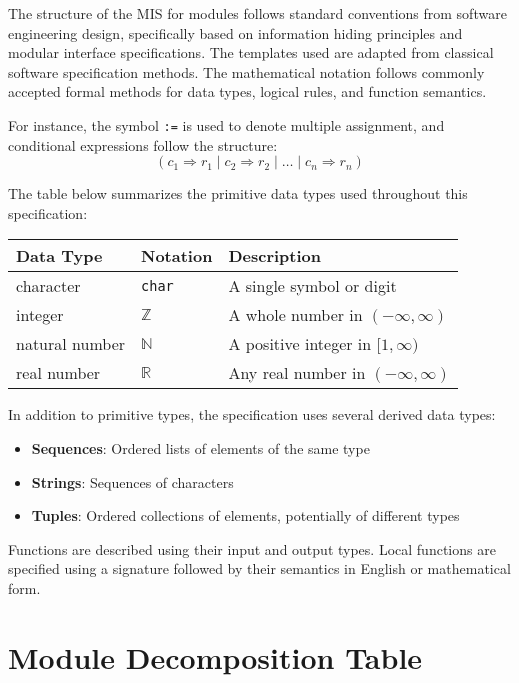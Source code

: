 \documentclass[12pt, titlepage]{article}
\begin{document}
The structure of the MIS for modules follows standard conventions from software engineering design, specifically based on information hiding principles and modular interface specifications. The templates used are adapted from classical software specification methods. The mathematical notation follows commonly accepted formal methods for data types, logical rules, and function semantics.

For instance, the symbol \texttt{:=} is used to denote multiple assignment, and conditional expressions follow the structure:
\[
(c_1 \Rightarrow r_1 \mid c_2 \Rightarrow r_2 \mid \dots \mid c_n \Rightarrow r_n)
\]

\noindent
The table below summarizes the primitive data types used throughout this specification:

\begin{center}
\renewcommand{\arraystretch}{1.2}
\begin{tabular}{l l p{7.5cm}} 
\toprule 
\textbf{Data Type} & \textbf{Notation} & \textbf{Description}\\ 
\midrule
character & \texttt{char} & A single symbol or digit\\
integer & $\mathbb{Z}$ & A whole number in $(-\infty, \infty)$ \\
natural number & $\mathbb{N}$ & A positive integer in $[1, \infty)$ \\
real number & $\mathbb{R}$ & Any real number in $(-\infty, \infty)$ \\
\bottomrule
\end{tabular} 
\end{center}

\noindent
In addition to primitive types, the specification uses several derived data types:
\begin{itemize}
  \item \textbf{Sequences}: Ordered lists of elements of the same type
  \item \textbf{Strings}: Sequences of characters
  \item \textbf{Tuples}: Ordered collections of elements, potentially of different types
\end{itemize}

\noindent
Functions are described using their input and output types. Local functions are specified using a signature followed by their semantics in English or mathematical form.


\section{Module Decomposition Table}
\label{SecModDecomp}
\end{document}
